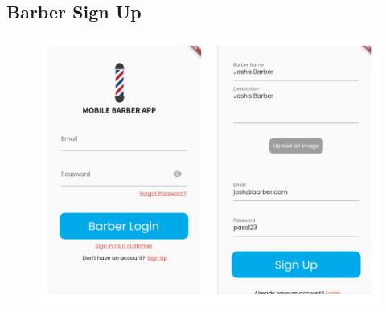 \documentclass[12pt]{article}
\begin{document}
	\subsection{Barber Sign Up}
	\label{app-image: barber-sign-up}
	\begin{figure}[H]
		\centering
		\includegraphics[scale=0.4]{images/barber-sign-up.png}
	\end{figure}
\end{document}
